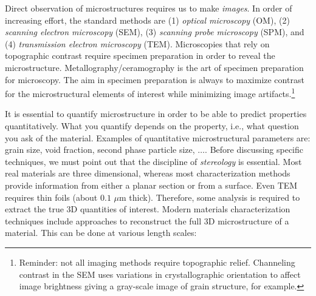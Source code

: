 Direct observation of microstructures requires us to make \textit{images}. In order of increasing effort, the standard methods are (1) \textit{optical microscopy} (OM), (2) \textit{scanning electron microscopy} (SEM),  (3) \textit{scanning probe microscopy} (SPM), and (4) \textit{transmission electron microscopy} (TEM).  Microscopies that rely on topographic contrast require specimen preparation in order to reveal the microstructure.  Metallography/ceramography is the art of specimen preparation for microscopy.  The aim in specimen preparation is always to maximize contrast for the microstructural elements of interest while minimizing image artifacts.\footnote{Reminder: not all imaging methods require topographic relief.  Channeling contrast in the SEM uses variations in crystallographic orientation to affect image brightness giving a gray-scale image of grain structure, for example.}

It is essential to quantify microstructure in order to be able to predict properties quantitatively.  What you quantify depends on the property, i.e., what question you ask of the material. Examples of quantitative microstructural parameters are: grain size, void fraction, second phase particle size, $\ldots$.  Before discussing specific techniques, we must point out that the discipline of \textit{stereology} is essential.  Most real materials are three dimensional, whereas most characterization methods provide information from either a planar section or from a surface. Even TEM requires thin foils (about $0.1$ $\mu$m thick). Therefore, some analysis is required to extract the true 3D quantities of interest. Modern materials characterization techniques include approaches to reconstruct the full 3D microstructure of a material. This can be done at various length scales:

